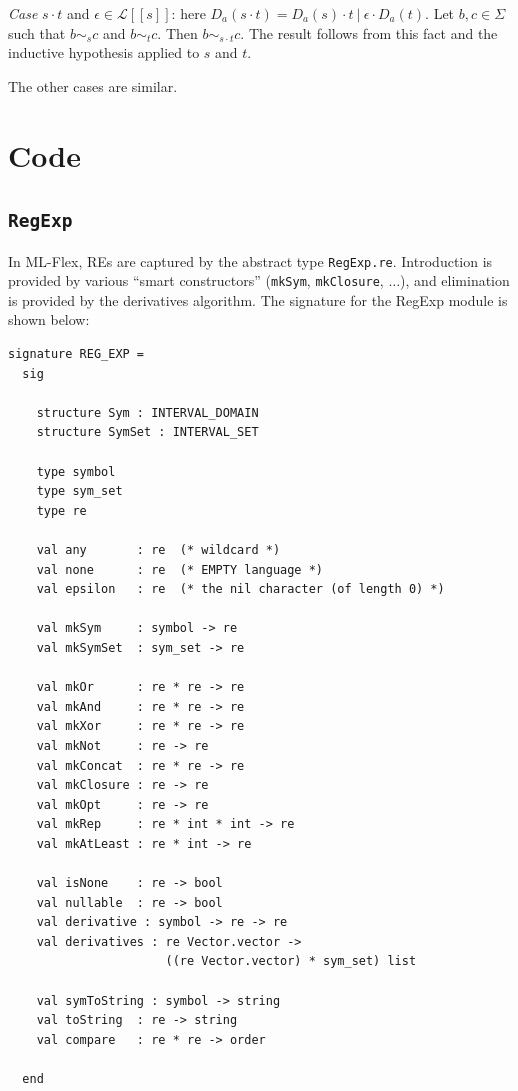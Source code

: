\documentclass[11pt]{article}
\newcommand{\flex}{ML-Flex}
\newcommand{\OR}{\ | \ }
\newcommand{\CL}{\mathcal{L}}
\newcommand{\Sem}[1]{[ \! [ #1 ] \! ]}
\newcommand{\Ls}[1]{\CL\Sem{#1}}
\newcommand{\nm}[1]{\texttt{#1}}
\begin{document}
\vskip 5pt
\emph{Case} $s \cdot t$ and $\epsilon \in \Ls{s}$: here $D_a(s \cdot t) = D_a(s) \cdot t \OR \epsilon \cdot D_a(t)$.  Let $b, c \in \Sigma$ such that $b \sim_s c$ and $b \sim_t c$.  Then $b \sim_{s \cdot t} c$.  The result follows from this fact and the inductive hypothesis applied to $s$ and $t$.

\vskip 5pt
The other cases are similar.

\newpage
\section{Code}\label{sec:code}

\subsection{\nm{RegExp}}\label{sec:reg-exp}

In \flex{}, REs are captured by the abstract type \nm{RegExp.re}.  Introduction
is provided by various ``smart constructors'' (\nm{mkSym}, \nm{mkClosure},
$\dots$), and elimination is provided by the derivatives algorithm.  The
signature for the \rm{RegExp} module is shown below:

\begin{verbatim}
signature REG_EXP =
  sig

    structure Sym : INTERVAL_DOMAIN
    structure SymSet : INTERVAL_SET

    type symbol
    type sym_set
    type re

    val any       : re  (* wildcard *)
    val none      : re  (* EMPTY language *)
    val epsilon   : re  (* the nil character (of length 0) *)

    val mkSym     : symbol -> re
    val mkSymSet  : sym_set -> re

    val mkOr      : re * re -> re
    val mkAnd     : re * re -> re
    val mkXor     : re * re -> re
    val mkNot     : re -> re
    val mkConcat  : re * re -> re
    val mkClosure : re -> re
    val mkOpt     : re -> re
    val mkRep     : re * int * int -> re
    val mkAtLeast : re * int -> re

    val isNone    : re -> bool
    val nullable  : re -> bool
    val derivative : symbol -> re -> re
    val derivatives : re Vector.vector ->
                      ((re Vector.vector) * sym_set) list

    val symToString : symbol -> string
    val toString  : re -> string
    val compare   : re * re -> order

  end
\end{verbatim}
\end{document}
